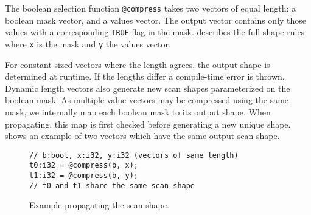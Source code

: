 The boolean selection function \texttt{@compress} takes two vectors of equal
length: a boolean mask vector, and a values vector. The output vector contains only
those values with a corresponding \texttt{TRUE} flag in the mask. 
describes the full shape rules where \texttt{x} is the mask and \texttt{y} the values
vector.

For constant sized vectors where the length agrees, the output shape is determined at
runtime. If the lengths differ a compile-time error is thrown. Dynamic length vectors
also generate new scan shapes parameterized on the boolean mask. As multiple value
vectors may be compressed using the same mask, we internally map each boolean mask
to its output shape. When propagating, this map is first checked before generating
a new unique shape.  shows an example of two vectors which
have the same output scan shape.

\begin{figure}[htbp]
\begin{lstlisting}[language=HorseIR, frame=single, basicstyle=\footnotesize]
// b:bool, x:i32, y:i32 (vectors of same length)
t0:i32 = @compress(b, x);
t1:i32 = @compress(b, y);
// t0 and t1 share the same scan shape
\end{lstlisting}
\vspace{-3mm}
\caption{Example propagating the scan shape.} \label{fig:scan_shape}
\end{figure}



